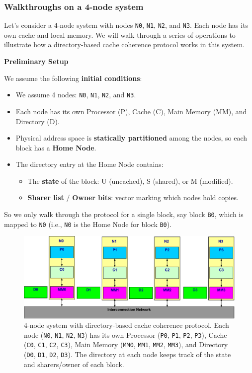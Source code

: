 \subsubsection{Walkthroughs on a 4-node system}

Let's consider a 4-node system with nodes \texttt{N0}, \texttt{N1}, \texttt{N2}, and \texttt{N3}. Each node has its own cache and local memory. We will walk through a series of operations to illustrate how a directory-based cache coherence protocol works in this system.

\highspace
\begin{flushleft}
    \textcolor{Green3}{ \textbf{Preliminary Setup}}
\end{flushleft}
We assume the following \textbf{initial conditions}:
\begin{itemize}
    \item We assume 4 nodes: \texttt{N0}, \texttt{N1}, \texttt{N2}, and \texttt{N3}.
    \item Each node has its own Processor (P), Cache (C), Main Memory (MM), and Directory (D).
    \item Physical address space is \textbf{statically partitioned} among the nodes, so each block has a \textbf{Home Node}.
    \item The directory entry at the Home Node contains:
    \begin{itemize}
        \item The \textbf{state} of the block: U (uncached), S (shared), or M (modified).
        \item \textbf{Sharer list} / \textbf{Owner bits}: vector marking which nodes hold copies.
    \end{itemize}
\end{itemize}
So we only walk through the protocol for a single block, say block \texttt{B0}, which is mapped to \texttt{N0} (i.e., \texttt{N0} is the Home Node for block \texttt{B0}).

\begin{figure}[!htp]
    \centering
    \includegraphics[width=\textwidth]{img/directory-based-protocol-3.pdf}
    \caption{4-node system with directory-based cache coherence protocol. Each node (\texttt{N0}, \texttt{N1}, \texttt{N2}, \texttt{N3}) has its own Processor (\texttt{P0}, \texttt{P1}, \texttt{P2}, \texttt{P3}), Cache (\texttt{C0}, \texttt{C1}, \texttt{C2}, \texttt{C3}), Main Memory (\texttt{MM0}, \texttt{MM1}, \texttt{MM2}, \texttt{MM3}), and Directory (\texttt{D0}, \texttt{D1}, \texttt{D2}, \texttt{D3}). The directory at each node keeps track of the state and sharers/owner of each block.}
\end{figure}

